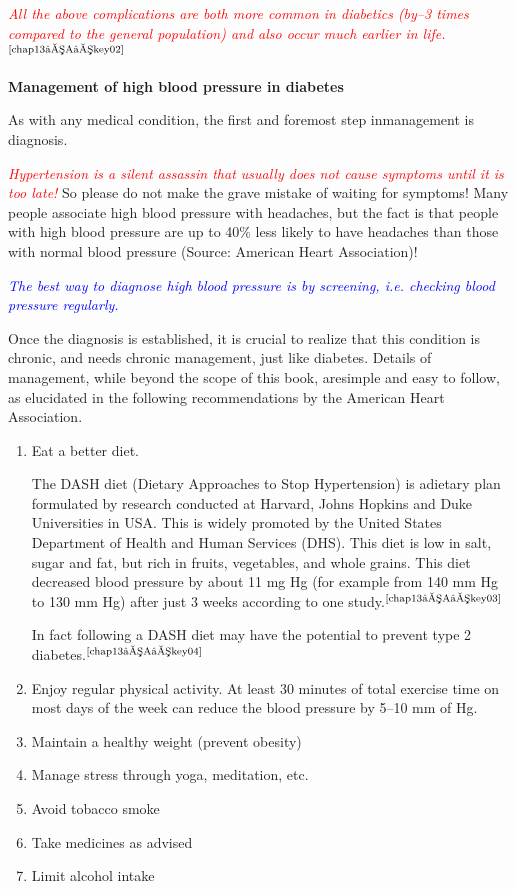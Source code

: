 \textcolor{red}{\textit{All the above complications are both more common in diabetics (by–3 times compared to the general population) and also occur much earlier in life.}}$^{\text{\cite{chap13–A–key02}}}$

\clearpage
\noindent\textbf{Management of high blood pressure in diabetes}

As with any medical condition, the first and foremost step in\break management is diagnosis.

\textcolor{red}{\textit{Hypertension is a silent assassin that usually does not cause symptoms until it is too late!}} So please do not make the grave mistake of wai\-ting for symptoms! Many people associate high blood pressure with headaches, but the fact is that people with high blood pressure are up to 40\% less likely to have headaches than those with normal blood pre\-ssure (Source: American Heart Association)!

\textcolor{blue}{\textit{The best way to diagnose high blood pressure is by screening, i.e. checking blood pressure regularly.}}

Once the diagnosis is established, it is crucial to realize that this condition is chronic, and needs chronic management, just like diabetes. Details of management, while beyond the scope of this book, are\break simple and easy to follow, as elucidated in the following recommenda\-tions by the American Heart Association.

\begin{enumerate}
\itemsep=0pt
\item Eat a better diet.
 
The DASH diet (Dietary Approaches to Stop Hypertension) is a\break dietary plan formulated by research conducted at Harvard, Johns Hopkins and Duke Universities in USA. This is widely promoted by the United States Department of Health and Human Services (DHS). This diet is low in salt, sugar and fat, but rich in fruits, vege\-tables, and whole grains. This diet decreased blood pressure by about 11 mg Hg (for example from 140 mm Hg to 130 mm Hg) after just 3 weeks according to one study.$^{\text{\cite{chap13–A–key03}}}$

 In fact following a DASH diet may have the potential to prevent type 2 diabetes.$^{\text{\cite{chap13–A–key04}}}$
\item Enjoy regular physical activity. At least 30 minutes of total exercise time on most days of the week can reduce the blood pressure by 5–10 mm of Hg.
\item Maintain a healthy weight (prevent obesity)
\item Manage stress through yoga, meditation, etc.
\item Avoid tobacco smoke
\item Take medicines as advised
\item Limit alcohol intake
\end{enumerate}


